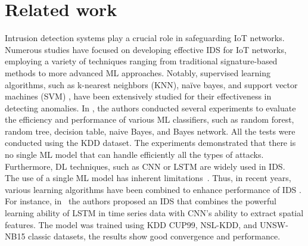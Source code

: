\section{Related work}
Intrusion detection systems play a crucial role in safeguarding \gls{IoT} networks. Numerous studies have focused on developing effective \gls{IDS} for \gls{IoT} networks, employing a variety of techniques ranging from traditional signature-based methods to more advanced \gls{ML} approaches. Notably, supervised learning algorithms, such as k-nearest neighbors (KNN), naïve bayes, and support vector machines (SVM) \cite{9994392}, have been extensively studied for their effectiveness in detecting anomalies. In \cite{8080566}, the authors conducted  several experiments to evaluate the efficiency and performance of various \gls{ML} classifiers, such as random forest, random tree, decision table, naive Bayes, and Bayes network. All the tests were conducted using the KDD dataset. The experiments demonstrated that there is no single \gls{ML} model that can handle efficiently all the types of attacks.
Furthermore, \gls{DL} techniques, such as \gls{CNN} or \gls{LSTM} \cite{9817245} are widely used in \gls{IDS}.\\
\indent The use of a single \gls{ML} model has inherent \mbox{limitations \cite{10419091}.} Thus, in recent years, various learning algorithms have been combined to enhance performance of \gls{IDS} \cite{menssouri}. For instance, \mbox{in \cite{10064274}} the authors proposed an \gls{IDS} that combines the powerful learning ability of LSTM in time series data with \gls{CNN}'s ability to extract spatial features. The model was trained using KDD CUP99, NSL-KDD, and UNSW-NB15 classic datasets, the results show good convergence and performance.\\
